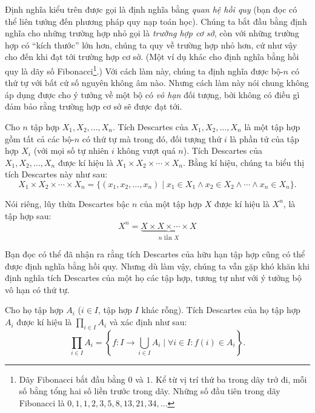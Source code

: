 Định nghĩa kiểu trên được gọi là định nghĩa bằng \textit{quan hệ hồi quy} (bạn đọc có thể liên tưởng đến phương pháp quy nạp toán học). Chúng ta bắt đầu bằng định nghĩa cho những trường hợp nhỏ gọi là \textit{trường hợp cơ sở}, còn với những trường hợp có ``kích thước'' lớn hơn, chúng ta quy về trường hợp nhỏ hơn, cứ như vậy cho đến khi đạt tới trường hợp cơ sở. (Một ví dụ khác cho định nghĩa bằng hồi quy là dãy số Fibonacci\footnote{Dãy Fibonacci bắt đầu bằng $0$ và $1$. Kể từ vị trí thứ ba trong dãy trở đi, mỗi số bằng tổng hai số liền trước trong dãy. Những số đầu tiên trong dãy Fibonacci là $0, 1, 1, 2, 3, 5, 8, 13, 21, 34,\ldots$}.) Với cách làm này, chúng ta định nghĩa được bộ-$n$ có thứ tự với bất cứ số nguyên không âm nào. Nhưng cách làm này nói chung không áp dụng được cho ý tưởng về một bộ có \textit{vô hạn} đối tượng, bởi không có điều gì đảm bảo rằng trường hợp cơ sở sẽ được đạt tới.

\begin{definition}
    Cho $n$ tập hợp $X_{1}, X_{2}, \ldots, X_{n}$. Tích Descartes của $X_{1}, X_{2}, \ldots, X_{n}$ là một tập hợp gồm tất cả các bộ-$n$ có thứ tự mà trong đó, đối tượng thứ $i$ là phần tử của tập hợp $X_{i}$ (với mọi số tự nhiên $i$ không vượt quá $n$). Tích Descartes của $X_{1}, X_{2}, \ldots, X_{n}$ được kí hiệu là $X_{1}\times X_{2}\times \cdots \times X_{n}$. Bằng kí hiệu, chúng ta biểu thị tích Descartes này như sau:
    \[
        X_{1}\times X_{2}\times \cdots \times X_{n} = \{ (x_{1}, x_{2}, \ldots, x_{n}) \mid x_{1}\in X_{1} \wedge x_{2}\in X_{2}\wedge \cdots \wedge x_{n}\in X_{n} \}.
    \]

    Nói riêng, lũy thừa Descartes bậc $n$ của một tập hợp $X$ được kí hiệu là $X^{n}$, là tập hợp sau:
    \[
        X^{n} = \underbrace{X\times X\times \cdots \times X}_{\text{$n$ lần $X$}}
    \]
\end{definition}

Bạn đọc có thể đã nhận ra rằng tích Descartes của hữu hạn tập hợp cũng có thể được định nghĩa bằng hồi quy. Nhưng dù làm vậy, chúng ta vẫn gặp khó khăn khi định nghĩa tích Descartes của một họ các tập hợp, tương tự như với ý tưởng bộ vô hạn có thứ tự.

\begin{definition}
    Cho họ tập hợp $A_{i}$ ($i\in I$, tập hợp $I$ khác rỗng). Tích Descartes của họ tập hợp $A_{i}$ được kí hiệu là $\prod_{i\in I}A_{i}$ và xác định như sau:
    \[
        \prod_{i\in I} A_{i} = \left\{ f: I\to \bigcup_{i\in I} A_{i} \mid \forall i\in I: f(i)\in A_{i} \right\}.
    \]
\end{definition}

